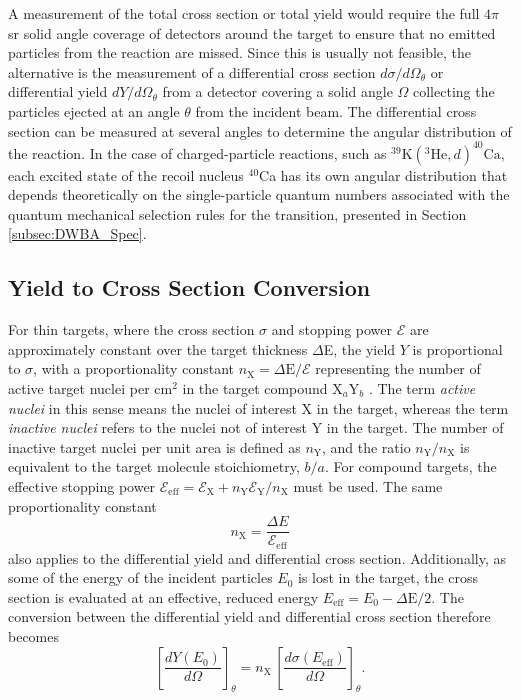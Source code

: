 A measurement of the total cross section or total yield would require the full $4\pi$ sr solid angle coverage of detectors around the target to ensure that no emitted particles from the reaction are missed. Since this is usually not feasible, the alternative is the measurement of a differential cross section $d\sigma/d\Omega_{\theta}$ or differential yield $dY/d\Omega_{\theta}$ from a detector covering a solid angle $\Omega$ collecting the particles ejected at an angle $\theta$ from the incident beam. The differential cross section can be measured at several angles to determine the angular distribution of the reaction. In the case of charged-particle reactions, such as $^{39}\mathrm{K}(^{3}\mathrm{He},d)^{40}\mathrm{Ca}$, each excited state of the recoil nucleus $^{40}$Ca has its own angular distribution that depends theoretically on the single-particle quantum numbers associated with the quantum mechanical selection rules for the transition, presented in Section \ref{subsec:DWBA_Spec}.

\subsection{Yield to Cross Section Conversion} \label{subsec:cs_calc}

For thin targets, where the cross section $\sigma$ and stopping power $\mathcal{E}$ are approximately constant over the target thickness $\Delta$E, the yield $Y$ is proportional to $\sigma$, with a proportionality constant $n_{\mathrm{X}} = \Delta \mathrm{E} / \mathcal{E}$ representing the number of active target nuclei per $\mathrm{cm}^{2}$ in the target compound $\mathrm{X}_{a}\mathrm{Y}_{b}$ \cite{Iliadis2015}. The term \emph{active nuclei} in this sense means the nuclei of interest $\mathrm{X}$ in the target, whereas the term \emph{inactive nuclei} refers to the nuclei not of interest $\mathrm{Y}$ in the target. The number of inactive target nuclei per unit area is defined as $n_{\mathrm{Y}}$, and the ratio $n_{\mathrm{Y}}/n_{\mathrm{X}}$ is equivalent to the target molecule stoichiometry, $b/a$. For compound targets, the effective stopping power $\mathcal{E}_{\mathrm{eff}} = \mathcal{E}_{\mathrm{X}} + n_{\mathrm{Y}}\mathcal{E}_{\mathrm{Y}} / n_{\mathrm{X}}$ must be used. The same proportionality constant 
\begin{equation}
n_{\mathrm{X}} = \frac{\Delta E}{\mathcal{E}_{\mathrm{eff}}}
\end{equation}
also applies to the differential yield and differential cross section. Additionally, as some of the energy of the incident particles $E_{0}$ is lost in the target, the cross section is evaluated at an effective, reduced energy $E_{\mathrm{eff}} = E_{0} - \Delta\mathrm{E}/2$. The conversion between the differential yield and differential cross section therefore becomes
\begin{equation} \label{eqn:yield_to_cross}
\left[ \frac{dY(E_{0})}{d\Omega} \right]_{\theta} = n_{\mathrm{X}} \, \left[ \frac{d\sigma(E_{\mathrm{eff}})}{d\Omega} \right]_{\theta}.
\end{equation}

